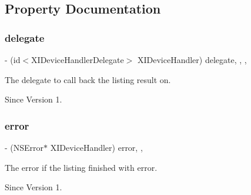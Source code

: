 \subsection{Property Documentation}
\hypertarget{protocol_x_i_device_handler_01-p_a09843895faf6f80b9da3688fcfc06feb}{}\label{protocol_x_i_device_handler_01-p_a09843895faf6f80b9da3688fcfc06feb} 
\subsubsection{\texorpdfstring{delegate}{delegate}}
{\footnotesize\ttfamily -\/ (id$<$X\+I\+Device\+Handler\+Delegate$>$ X\+I\+Device\+Handler) delegate\hspace{0.3cm}{\ttfamily [read]}, {\ttfamily [write]}, {\ttfamily [nonatomic]}, {\ttfamily [weak]}}



The delegate to call back the listing result on. 

\begin{DoxySince}{Since}
Version 1. 
\end{DoxySince}
\hypertarget{protocol_x_i_device_handler_01-p_af962d7c523a442dfcb6cca4c0ac5672b}{}\label{protocol_x_i_device_handler_01-p_af962d7c523a442dfcb6cca4c0ac5672b} 
\subsubsection{\texorpdfstring{error}{error}}
{\footnotesize\ttfamily -\/ (N\+S\+Error$\ast$ X\+I\+Device\+Handler) error\hspace{0.3cm}{\ttfamily [read]}, {\ttfamily [nonatomic]}, {\ttfamily [assign]}}



The error if the listing finished with error. 

\begin{DoxySince}{Since}
Version 1. 
\end{DoxySince}
\hypertarget{protocol_x_i_device_handler_01-p_a9dcd7f0b3c074a7d3b0e7d63fc044fdb}{}\label{protocol_x_i_device_handler_01-p_a9dcd7f0b3c074a7d3b0e7d63fc044fdb} 
